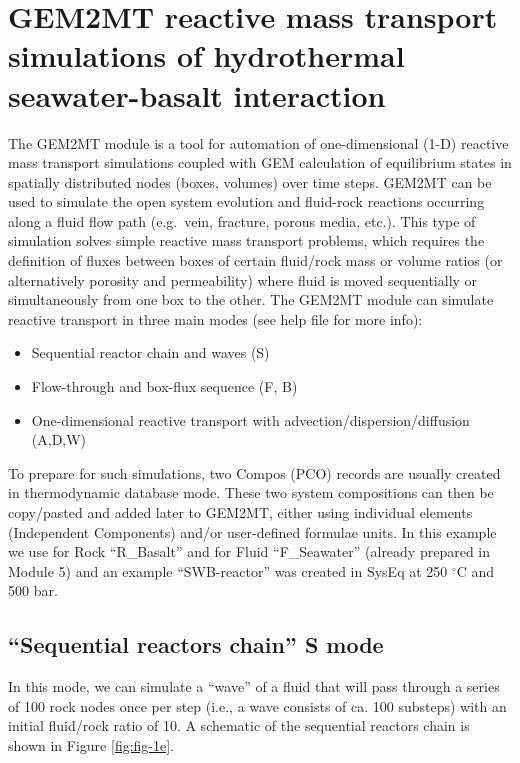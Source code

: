 \documentclass[
]{book}
\providecommand{\tightlist}{%
  \setlength{\itemsep}{0pt}\setlength{\parskip}{0pt}}
\begin{document}
\hypertarget{module5}{%
\chapter{GEM2MT reactive mass transport simulations of hydrothermal seawater-basalt interaction}\label{module5}}

The GEM2MT module is a tool for automation of one-dimensional (1-D) reactive mass transport simulations coupled with GEM calculation of equilibrium states in spatially distributed nodes (boxes, volumes) over time steps. GEM2MT can be used to simulate the open system evolution and fluid-rock reactions occurring along a fluid flow path (e.g.~vein, fracture, porous media, etc.). This type of simulation solves simple reactive mass transport problems, which requires the definition of fluxes between boxes of certain fluid/rock mass or volume ratios (or alternatively porosity and permeability) where fluid is moved sequentially or simultaneously from one box to the other. The GEM2MT module can simulate reactive transport in three main modes (see help file for more info):

\begin{itemize}
\tightlist
\item
  Sequential reactor chain and waves (S)
\item
  Flow-through and box-flux sequence (F, B)
\item
  One-dimensional reactive transport with advection/dispersion/diffusion (A,D,W)
\end{itemize}

To prepare for such simulations, two Compos (PCO) records are usually created in thermodynamic database mode. These two system compositions can then be copy/pasted and added later to GEM2MT, either using individual elements (Independent Components) and/or user-defined formulae units. In this example we use for Rock ``R\_Basalt'' and for Fluid ``F\_Seawater'' (already prepared in Module 5) and an example ``SWB-reactor'' was created in SysEq at 250 \(^{\circ}\)C and 500 bar.

\hypertarget{sequential-reactors-chain-s-mode}{%
\section{``Sequential reactors chain'' S mode}\label{sequential-reactors-chain-s-mode}}

In this mode, we can simulate a ``wave'' of a fluid that will pass through a series of 100 rock nodes once per step (i.e., a wave consists of ca. 100 substeps) with an initial fluid/rock ratio of 10. A schematic of the sequential reactors chain is shown in Figure \ref{fig:fig-1e}.
\end{document}
